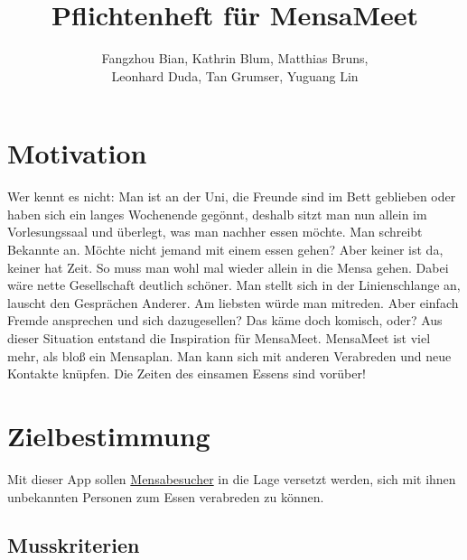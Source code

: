 \documentclass[a4paper]{scrreprt}
\begin{document}
\title{Pflichtenheft für MensaMeet}
\author{Fangzhou Bian, Kathrin Blum, Matthias Bruns, \\Leonhard Duda, Tan Grumser, Yuguang Lin}
\maketitle
\tableofcontents



\chapter{Motivation}

Wer kennt es nicht: Man ist an der Uni, die Freunde sind im Bett geblieben oder haben sich ein langes Wochenende gegönnt, deshalb sitzt man nun allein im Vorlesungssaal und überlegt, was man nachher essen möchte. Man schreibt Bekannte an. Möchte nicht jemand mit einem essen gehen? Aber keiner ist da, keiner hat Zeit. So muss man wohl mal wieder allein in die Mensa gehen. Dabei wäre nette Gesellschaft deutlich schöner. Man stellt sich in der Linienschlange an, lauscht den Gesprächen Anderer. Am liebsten würde man mitreden. Aber einfach Fremde ansprechen und sich dazugesellen? Das käme doch komisch, oder? Aus dieser Situation entstand die Inspiration für MensaMeet. MensaMeet ist viel mehr, als bloß ein Mensaplan. Man kann sich mit anderen Verabreden und neue Kontakte knüpfen. Die Zeiten des einsamen Essens sind vorüber!

\chapter{Zielbestimmung}
Mit dieser App sollen \hyperlink{label1}{Mensabesucher} in die Lage versetzt werden, sich mit ihnen unbekannten Personen zum Essen verabreden zu können.
 
\section{Musskriterien}
\end{document}
